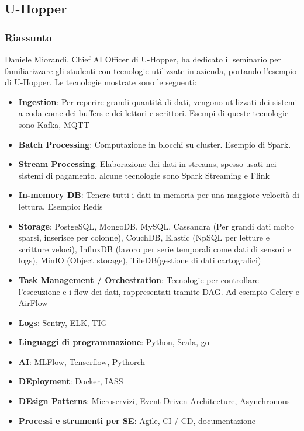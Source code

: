\documentclass{report}
\begin{document}
\subsection{U-Hopper}

\subsubsection*{Riassunto}

Daniele Miorandi, Chief AI Officer  di U-Hopper, ha dedicato il seminario per familiarizzare gli studenti con tecnologie utilizzate in azienda, portando l'esempio di U-Hopper. Le tecnologie mostrate sono le seguenti:
\begin{itemize}
	\item \textbf{Ingestion}: Per reperire grandi quantità di dati, vengono utilizzati dei sistemi a coda come dei buffers e dei lettori e scrittori. Esempi di queste tecnologie sono Kafka, MQTT
	\item \textbf{Batch Processing}: Computazione in blocchi su cluster. Esempio di Spark.
	\item \textbf{Stream Processing}: Elaborazione dei dati in streams, spesso usati nei sistemi di pagamento. alcune tecnologie sono Spark Streaming e Flink
	\item \textbf{In-memory DB}: Tenere tutti i dati in memoria per una maggiore velocità di lettura. Esempio: Redis
	\item \textbf{Storage}: PostgeSQL, MongoDB, MySQL, Cassandra (Per grandi dati molto sparsi, inserisce per colonne), CouchDB, Elastic (NpSQL per letture e scritture veloci), InfluxDB (lavoro per serie temporali come dati di sensori e logs), MinIO (Object storage), TileDB(gestione di dati cartografici)
	\item \textbf{Task Management / Orchestration}: Tecnologie per controllare l'esecuzione e i flow dei dati, rappresentati tramite DAG. Ad esempio Celery e AirFlow
	\item \textbf{Logs}: Sentry, ELK, TIG
	\item \textbf{Linguaggi di programmazione}: Python, Scala, go
	\item \textbf{AI}: MLFlow, Tenserflow, Pythorch
	\item \textbf{DEployment}: Docker, IASS
	\item \textbf{DEsign Patterns}: Microservizi, Event Driven Architecture, Asynchronous
	\item \textbf{Processi e strumenti per SE}: Agile, CI / CD, documentazione
\end{itemize}
\end{document}
